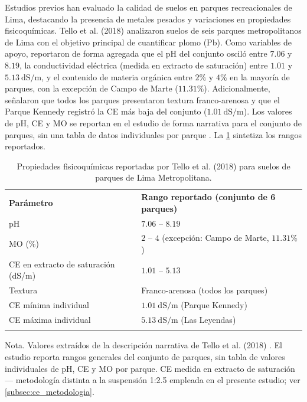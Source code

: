 \documentclass[fleqn]{jaes}
\begin{document}
Estudios previos han evaluado la calidad de suelos en parques recreacionales de Lima, destacando la presencia de metales pesados y variaciones en propiedades fisicoquímicas. Tello et al. (2018) analizaron suelos de seis parques metropolitanos de Lima con el objetivo principal de cuantificar plomo (Pb). Como variables de apoyo, reportaron de forma agregada que el pH del conjunto osciló entre $7.06$ y $8.19$, la conductividad eléctrica (medida en extracto de saturación) entre $1.01$ y $5.13~\text{dS/m}$, y el contenido de materia orgánica entre $2\%$ y $4\%$ en la mayoría de parques, con la excepción de Campo de Marte ($11.31\%$). Adicionalmente, señalaron que todos los parques presentaron textura franco-arenosa y que el Parque Kennedy registró la CE más baja del conjunto ($1.01~\text{dS/m}$). Los valores de pH, CE y MO se reportan en el estudio de forma narrativa para el conjunto de parques, sin una tabla de datos individuales por parque \cite{Tello2018}. La \cref{tab:comparativa_tello} sintetiza los rangos reportados.

\begin{table}[!ht]
\centering
\caption{Propiedades fisicoquímicas reportadas por Tello et al. (2018) para suelos de parques de Lima Metropolitana.}\label{tab:comparativa_tello}
\begin{tabular}{@{}lp{7cm}@{}}
\toprule
\textbf{Parámetro} & \textbf{Rango reportado (conjunto de 6 parques)} \\
\colrule
pH & $7.06$ -- $8.19$ \\
MO (\%) & $2$ -- $4$ (excepción: Campo de Marte, $11.31\%$) \\
CE en extracto de saturación (dS/m) & $1.01$ -- $5.13$ \\
Textura & Franco-arenosa (todos los parques) \\
CE mínima individual & $1.01~\text{dS/m}$ (Parque Kennedy) \\
CE máxima individual & $5.13~\text{dS/m}$ (Las Leyendas) \\
\botrule
\end{tabular}
\begin{tabnote}
Nota. Valores extraídos de la descripción narrativa de Tello et al. (2018) \cite{Tello2018}. El estudio reporta rangos generales del conjunto de parques, sin tabla de valores individuales de pH, CE y MO por parque. CE medida en extracto de saturación --- metodología distinta a la suspensión 1:2.5 empleada en el presente estudio; ver \cref{subsec:ce_metodologia}.
\end{tabnote}
\end{table}
\end{document}
